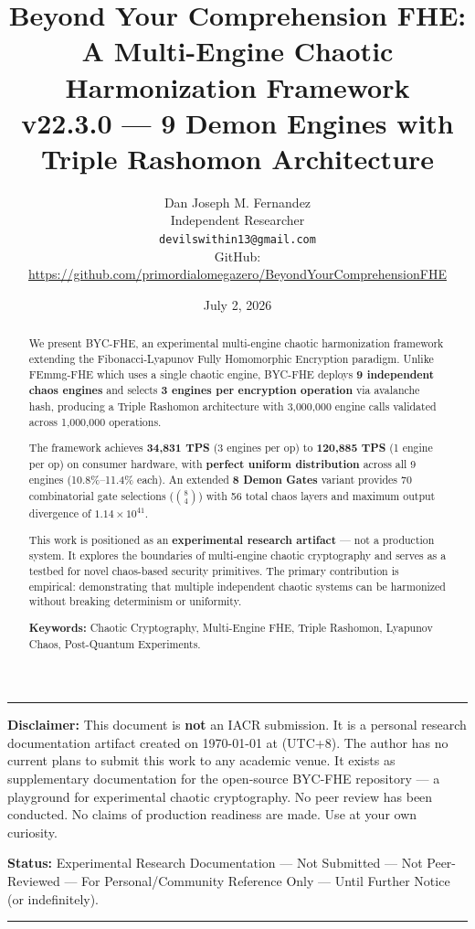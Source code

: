 \documentclass[11pt,a4paper]{article}
\title{Beyond Your Comprehension FHE:\\
A Multi-Engine Chaotic Harmonization Framework\\
{\large v22.3.0 — 9 Demon Engines with Triple Rashomon Architecture}}
\author{Dan Joseph M. Fernandez\\
Independent Researcher\\
\texttt{devilswithin13@gmail.com}\\
{\small GitHub: \url{https://github.com/primordialomegazero/BeyondYourComprehensionFHE}}}
\date{July 2, 2026}
\begin{document}
\maketitle

\begin{abstract}
We present BYC-FHE, an experimental multi-engine chaotic harmonization framework extending the Fibonacci-Lyapunov Fully Homomorphic Encryption paradigm. Unlike FEmmg-FHE which uses a single chaotic engine, BYC-FHE deploys \textbf{9 independent chaos engines} and selects \textbf{3 engines per encryption operation} via avalanche hash, producing a Triple Rashomon architecture with 3,000,000 engine calls validated across 1,000,000 operations.

The framework achieves \textbf{34,831 TPS} (3 engines per op) to \textbf{120,885 TPS} (1 engine per op) on consumer hardware, with \textbf{perfect uniform distribution} across all 9 engines (10.8\%–11.4\% each). An extended \textbf{8 Demon Gates} variant provides 70 combinatorial gate selections ($\binom{8}{4}$) with 56 total chaos layers and maximum output divergence of $1.14 \times 10^{41}$.

This work is positioned as an \textbf{experimental research artifact} — not a production system. It explores the boundaries of multi-engine chaotic cryptography and serves as a testbed for novel chaos-based security primitives. The primary contribution is empirical: demonstrating that multiple independent chaotic systems can be harmonized without breaking determinism or uniformity.

\textbf{Keywords:} Chaotic Cryptography, Multi-Engine FHE, Triple Rashomon, Lyapunov Chaos, Post-Quantum Experiments.
\end{abstract}
\vspace{10pt}
\hrule
\vspace{5pt}
{\small \textbf{Disclaimer:} This document is \textbf{not} an IACR submission. It is a personal research documentation artifact created on \today{} at \currenttime{} (UTC+8). The author has no current plans to submit this work to any academic venue. It exists as supplementary documentation for the open-source BYC-FHE repository — a playground for experimental chaotic cryptography. No peer review has been conducted. No claims of production readiness are made. Use at your own curiosity.}

{\small \textbf{Status:} Experimental Research Documentation — Not Submitted — Not Peer-Reviewed — For Personal/Community Reference Only — Until Further Notice (or indefinitely).}
\vspace{5pt}
\hrule
\vspace{10pt}
\end{document}
